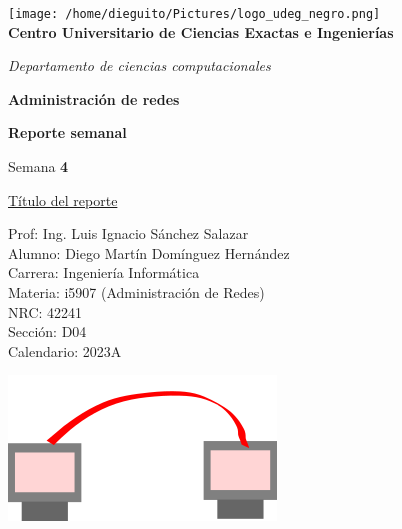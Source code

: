 \documentclass[]{article}
\begin{document}
\begin{titlepage}
\begin{center}
	\texttt{[image: /home/dieguito/Pictures/logo\_udeg\_negro.png]}\\
	\vspace{1cm}
{\Large 	\textbf{Centro Universitario de Ciencias Exactas e Ingenierías}\\}

\vspace{0.5cm}
	
{\large 	\textit{Departamento de ciencias computacionales}\\}
	
	\vspace{1cm}
	
	\textbf{Administración de redes}\\
	
	\vspace{0.5cm}
	
	\textbf{Reporte semanal}\\
	
	\vspace{0.5cm}
	
	Semana \textbf{4}
	
	\vspace{0.5cm}
	
	\underline{Título del reporte}\\
	
	\vspace{1cm}
	
	Prof: Ing. Luis Ignacio Sánchez Salazar\\
	
	Alumno: Diego Martín Domínguez Hernández\\
	
	Carrera: Ingeniería Informática \\
	
	Materia: i5907 (Administración de Redes)\\
	
	NRC: 42241\\
	
	Sección: D04\\

	Calendario: 2023A\\
	
\end{center}
\end{titlepage}
	\begin{center}
		\includegraphics[scale=0.25]{computadoras.png}
	\end{center}
\end{document}

